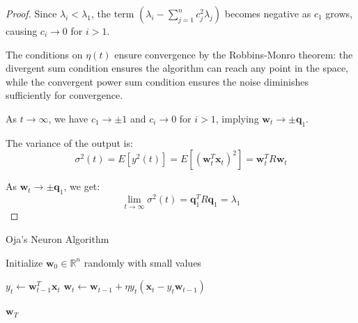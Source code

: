 \begin{proof}
    Since $\lambda_i < \lambda_1$, the term $(\lambda_i - \sum_{j=1}^n c_j^2 \lambda_j)$ becomes negative as $c_1$ grows, causing $c_i \to 0$ for $i > 1$.
   
    The conditions on $\eta(t)$ ensure convergence by the Robbins-Monro theorem: the divergent sum condition ensures the algorithm can reach any point in the space, while the convergent power sum condition ensures the noise diminishes sufficiently for convergence.
   
    As $t \to \infty$, we have $c_1 \to \pm 1$ and $c_i \to 0$ for $i > 1$, implying $\mathbf{w}_t \to \pm\mathbf{q}_1$.
   
    The variance of the output is:
    \begin{equation}
      \sigma^2(t) = E[y^2(t)] = E[(\mathbf{w}_t^T \mathbf{x}_t)^2] = \mathbf{w}_t^T R \mathbf{w}_t
    \end{equation}
   
    As $\mathbf{w}_t \to \pm\mathbf{q}_1$, we get:
    \begin{equation}
      \lim_{t \to \infty} \sigma^2(t) = \mathbf{q}_1^T R \mathbf{q}_1 = \lambda_1
    \end{equation}
  \end{proof}
 
  \begin{algo}
    \begin{algorithm}[H]
      \caption{Oja's Neuron Algorithm}
      \label{alg:oja_neuron}
      \begin{algorithmic}[1]
            
        
        \State Initialize $\mathbf{w}_0 \in \mathbb{R}^n$ randomly with small values
        
          \State $y_t \gets \mathbf{w}_{t-1}^T \mathbf{x}_t$ 
          \State $\mathbf{w}_t \gets \mathbf{w}_{t-1} + \eta y_t (\mathbf{x}_t - y_t \mathbf{w}_{t-1})$ 
        \EndFor
        
        \State \Return $\mathbf{w}_T$
        \EndProcedure
      \end{algorithmic}
    \end{algorithm}
  \end{algo}

